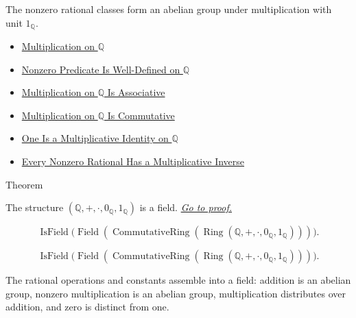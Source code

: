 \begin{remark*}[Interpretation]
The nonzero rational classes form an abelian group under multiplication with
unit $1_{\mathbb{Q}}$.
\end{remark*}

\begin{dependencies}
\begin{itemize}
\item \hyperref[def:multiplication-on-q-classes]{Multiplication on $\mathbb{Q}$}
  \item \hyperref[lem:nonzero-predicate-well-defined-q]{Nonzero Predicate Is Well-Defined on $\mathbb{Q}$}
  \item \hyperref[thm:multiplication-on-q-associative]{Multiplication on $\mathbb{Q}$ Is Associative}
  \item \hyperref[thm:multiplication-on-q-commutative]{Multiplication on $\mathbb{Q}$ Is Commutative}
  \item \hyperref[thm:one-multiplicative-identity-on-q]{One Is 
a Multiplicative Identity on $\mathbb{Q}$}
  \item \hyperref[thm:every-nonzero-rational-has-multiplicative-inverse]{Every Nonzero Rational Has a Multiplicative Inverse}
\end{itemize}
\end{dependencies}

\begin{theorembox}{Theorem}
\begin{theorem}
\label{thm:q-is-a-field}
The structure $(\mathbb{Q},+,\cdot,0_{\mathbb{Q}},1_{\mathbb{Q}})$ is a field.
\hyperref[prf:q-is-a-field]{\textit{Go to proof.}}
\end{theorem}
\end{theorembox}

\begin{remark*}
\[
\operatorname{IsField}
\bigl(\operatorname{Field}(
\operatorname{CommutativeRing}(\operatorname{Ring}(
\mathbb{Q},+,\cdot,0_{\mathbb{Q}},1_{\mathbb{Q}})))\bigr).
\]
\end{remark*}

\begin{remark*}
\[
\operatorname{IsField}
\bigl(\operatorname{Field}(
\operatorname{CommutativeRing}(\operatorname{Ring}(
\mathbb{Q},+,\cdot,0_{\mathbb{Q}},1_{\mathbb{Q}})))\bigr).
\]
\end{remark*}

\begin{remark*}[Interpretation]
The rational operations and constants assemble into a field: addition is an
abelian group, nonzero multiplication is an abelian group, multiplication
distributes over addition, and zero is distinct from one.
\end{remark*}

